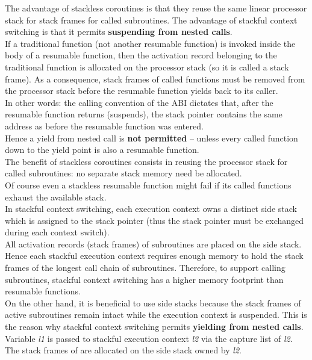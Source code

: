 The advantage of stackless coroutines is that they reuse the same linear
processor stack for stack frames for called subroutines. The advantage of
stackful context switching is that it permits {\bfseries suspending from
nested calls}.\\
\newline
If a traditional function (not another resumable function) is invoked inside
the body of a resumable function, then the activation record belonging to the
traditional function is allocated on the processor stack (so it is called a
stack frame). As a consequence, stack frames of called functions must be
removed from the processor stack before the resumable function yields back to
its caller.\\
In other words: the calling convention of the ABI dictates that, after the
resumable function returns (suspends), the stack pointer contains the same
address as before the resumable function was entered.\\
Hence a yield from nested call is {\bfseries not permitted} -- unless every
called function down to the yield point is also a resumable function.\\
The benefit of stackless coroutines consists in reusing the processor stack
for called subroutines: no separate stack memory need be allocated.\\
\newline
Of course even a stackless resumable function might fail if its called
functions exhaust the available stack.\\
\newline
In stackful context switching, each execution context owns a
distinct side stack which is assigned to the stack pointer (thus the stack
pointer must be exchanged during each context switch).\\
All activation records (stack frames) of subroutines are placed on the side
stack. Hence each stackful execution context requires enough memory to hold
the stack frames of the longest call chain of subroutines. Therefore, to
support calling subroutines, stackful context switching has a higher memory
footprint than resumable functions.\\
On the other hand, it is beneficial to use side stacks because the stack
frames of active subroutines remain intact while the execution context is
suspended. This is the reason why stackful context switching permits
{\bfseries yielding from nested calls}.
Variable \emph{l1} is passed to stackful execution context \emph{l2} via
the capture list of \emph{l2}. The stack frames of  are
allocated on the side stack owned by \emph{l2}.

